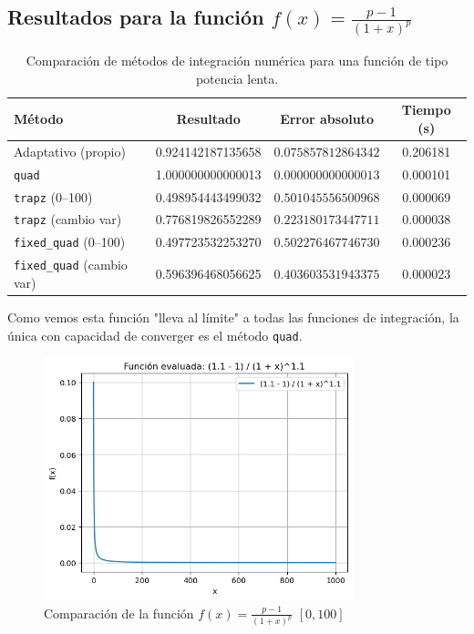 \documentclass{article}
\begin{document}
\subsection{Resultados para la función $f(x) = \frac{p-1}{(1+x)^p}$}

\begin{table}[H]
    \centering
    \begin{tabular}{|l|c|c|c|}
    \hline
    \textbf{Método} & \textbf{Resultado} & \textbf{Error absoluto} & \textbf{Tiempo (s)} \\
    \hline
    Adaptativo (propio) & 0.924142187135658 & $0.075857812864342$ & 0.206181 \\
    
    \texttt{quad} & 1.000000000000013 & $0.000000000000013$ & 0.000101 \\
    
    \texttt{trapz} (0--100) & 0.498954443499032 & $0.501045556500968$ & 0.000069 \\
    
    \texttt{trapz} (cambio var) & 0.776819826552289 & $0.223180173447711$ & 0.000038 \\
    
    \texttt{fixed\_quad} (0--100) & 0.497723532253270 & $0.502276467746730$ & 0.000236 \\
    
    \texttt{fixed\_quad} (cambio var) & 0.596396468056625 & $ 0.403603531943375$ & 0.000023 \\
    \hline
    \end{tabular}
    \caption{Comparación de métodos de integración numérica para una función de tipo potencia lenta.}
    \label{tab:resultados_potencia}
\end{table}
    
Como vemos esta función "lleva al límite" a todas las funciones de integración, la única con capacidad de converger es el método \texttt{quad}.

\begin{figure}
    \centering
    \includegraphics[width=0.8\textwidth]{figures/f_prueba_ld.png}
    \caption{Comparación de la función $f(x) = \frac{p-1}{(1+x)^p}$ $[0, 100]$}
    \label{fig:gauss_kronrod}
\end{figure}
\end{document}
